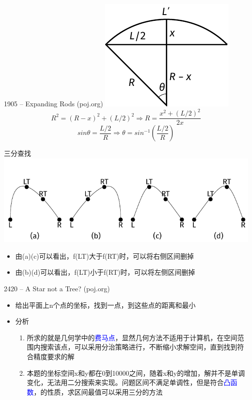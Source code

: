 \begin{frame}{1905 -- Expanding Rods (poj.org)}
    \includegraphics[center]{fig/2-5.pdf}
    $$R^2=(R-x)^2+(L/2)^2\Rightarrow R=\frac{x^2+(L/2)^2}{2x}$$
	$$sinθ=\frac{L/2}{R}\Rightarrow θ=sin^{-1}(\frac{L/2}{R})$$
\end{frame}
\begin{frame}{三分查找}
    \includegraphics[scale=.9]{fig/2-6.pdf}
    \begin{itemize}
        \item 由(a)(c)可以看出，f(LT)大于f(RT)时，可以将右侧区间删掉
        \item 由(b)(d)可以看出，f(LT)小于f(RT)时，可以将左侧区间删掉
    \end{itemize}
\end{frame}
\begin{frame}{2420 -- A Star not a Tree? (poj.org)}
    \begin{itemize}
        \item 给出平面上n个点的坐标，找到一点，到这些点的距离和最小
    \end{itemize}
    \vfill
    \begin{itemize}
        \item 分析
        \begin{enumerate}
            \item 所求的就是几何学中的\textcolor{blue}{费马点}，显然几何方法不适用于计算机，在空间范围内搜索该点，可以采用分治策略进行，不断缩小求解空间，直到找到符合精度要求的解
            \item 本题的坐标空间x和y都在0到10000之间，随着x和y的增加，解并不是单调变化，无法用二分搜索来实现。问题区间不满足单调性，但是符合\textcolor{blue}{凸函数}，的性质，求区间最值可以采用三分的方法
        \end{enumerate}
    \end{itemize}
\end{frame}
